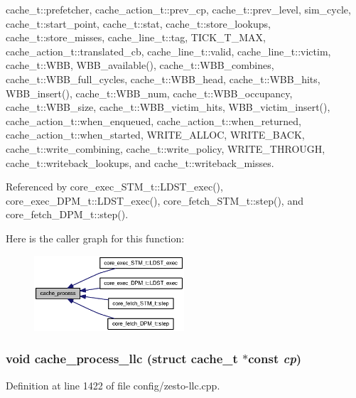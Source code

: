cache\_\-t::prefetcher, cache\_\-action\_\-t::prev\_\-cp, cache\_\-t::prev\_\-level, sim\_\-cycle, cache\_\-t::start\_\-point, cache\_\-t::stat, cache\_\-t::store\_\-lookups, cache\_\-t::store\_\-misses, cache\_\-line\_\-t::tag, TICK\_\-T\_\-MAX, cache\_\-action\_\-t::translated\_\-cb, cache\_\-line\_\-t::valid, cache\_\-line\_\-t::victim, cache\_\-t::WBB, WBB\_\-available(), cache\_\-t::WBB\_\-combines, cache\_\-t::WBB\_\-full\_\-cycles, cache\_\-t::WBB\_\-head, cache\_\-t::WBB\_\-hits, WBB\_\-insert(), cache\_\-t::WBB\_\-num, cache\_\-t::WBB\_\-occupancy, cache\_\-t::WBB\_\-size, cache\_\-t::WBB\_\-victim\_\-hits, WBB\_\-victim\_\-insert(), cache\_\-action\_\-t::when\_\-enqueued, cache\_\-action\_\-t::when\_\-returned, cache\_\-action\_\-t::when\_\-started, WRITE\_\-ALLOC, WRITE\_\-BACK, cache\_\-t::write\_\-combining, cache\_\-t::write\_\-policy, WRITE\_\-THROUGH, cache\_\-t::writeback\_\-lookups, and cache\_\-t::writeback\_\-misses.

Referenced by core\_\-exec\_\-STM\_\-t::LDST\_\-exec(), core\_\-exec\_\-DPM\_\-t::LDST\_\-exec(), core\_\-fetch\_\-STM\_\-t::step(), and core\_\-fetch\_\-DPM\_\-t::step().

Here is the caller graph for this function:\nopagebreak
\begin{figure}[H]
\begin{center}
\leavevmode
\includegraphics[width=158pt]{zesto-cache_8h_93ce14ef87e7565964216ea27d912147_icgraph}
\end{center}
\end{figure}
\subsubsection[{cache\_\-process\_\-llc}]{\setlength{\rightskip}{0pt plus 5cm}void cache\_\-process\_\-llc (struct {\bf cache\_\-t} $\ast$const  {\em cp})}\label{zesto-cache_8h_7b2967a29a17913e313fceec0d9dbd4c}




Definition at line 1422 of file config/zesto-llc.cpp.

